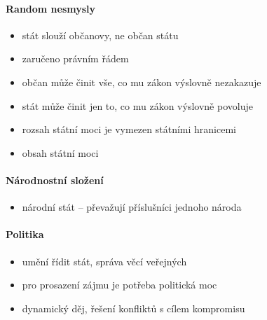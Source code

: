 \paragraph{Random nesmysly}
\begin{itemize}
\item stát slouží občanovy, ne občan státu	
\item zaručeno právním řádem
\item občan může činit vše, co mu zákon výslovně nezakazuje
\item stát může činit jen to, co mu zákon výslovně povoluje
\item rozsah státní moci je vymezen státními hranicemi
\item obsah státní moci 
\end{itemize}

\paragraph{Národnostní složení}
\begin{itemize}
\item národní stát -- převažují příslušníci jednoho národa
\end{itemize}


\paragraph{Politika}
\begin{itemize}
\item umění řídit stát, správa věcí veřejných
\item pro prosazení zájmu je potřeba politická moc
\item dynamický děj, řešení konfliktů s cílem kompromisu
\end{itemize}

